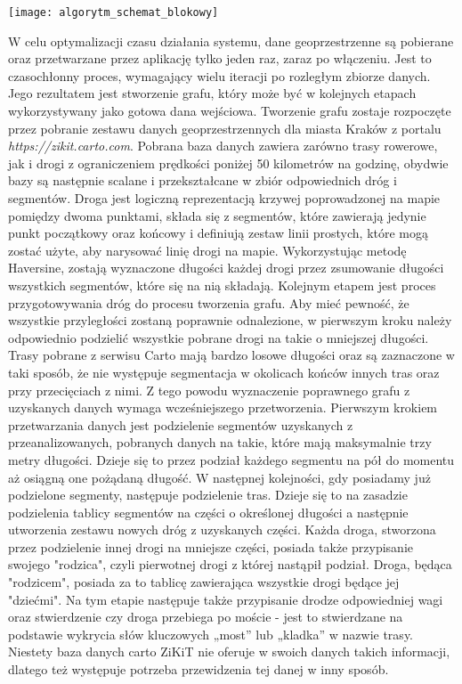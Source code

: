 \begin{center}
\texttt{[image: algorytm\_schemat\_blokowy]}
\end{center}

W celu optymalizacji czasu działania systemu, dane geoprzestrzenne są pobierane oraz przetwarzane przez aplikację tylko jeden raz, zaraz po włączeniu. Jest to czasochłonny proces, wymagający wielu iteracji po rozległym zbiorze danych. Jego rezultatem jest stworzenie grafu, który może być w kolejnych etapach wykorzystywany jako gotowa dana wejściowa. Tworzenie grafu zostaje rozpoczęte przez pobranie zestawu danych geoprzestrzennych dla miasta Kraków z portalu \textit{https://zikit.carto.com}. Pobrana baza danych zawiera zarówno trasy rowerowe, jak i drogi z ograniczeniem prędkości poniżej 50 kilometrów na godzinę, obydwie bazy są następnie scalane i przekształcane w zbiór odpowiednich dróg i segmentów. Droga jest logiczną reprezentacją krzywej poprowadzonej na mapie pomiędzy dwoma punktami, składa się z segmentów, które zawierają jedynie punkt początkowy oraz końcowy i definiują zestaw linii prostych, które mogą zostać użyte, aby narysować linię drogi na mapie. Wykorzystując metodę Haversine, zostają wyznaczone długości każdej drogi przez zsumowanie długości wszystkich segmentów, które się na nią składają. \newline
Kolejnym etapem jest proces przygotowywania dróg do procesu tworzenia grafu. Aby mieć pewność, że wszystkie przyległości zostaną poprawnie odnalezione, w pierwszym kroku należy odpowiednio podzielić wszystkie pobrane drogi na takie o mniejszej długości. Trasy pobrane z serwisu Carto mają bardzo losowe długości oraz są zaznaczone w taki sposób, że nie występuje segmentacja w okolicach końców innych tras oraz przy przecięciach z nimi. Z tego powodu wyznaczenie poprawnego grafu z uzyskanych danych wymaga wcześniejszego przetworzenia. Pierwszym krokiem przetwarzania danych jest podzielenie segmentów uzyskanych z przeanalizowanych, pobranych danych na takie, które mają maksymalnie trzy metry długości. Dzieje się to przez podział każdego segmentu na pół do momentu aż osiągną one pożądaną długość. W następnej kolejności, gdy posiadamy już podzielone segmenty, następuje podzielenie tras. Dzieje się to na zasadzie podzielenia tablicy segmentów na części o określonej długości a następnie utworzenia zestawu nowych dróg z uzyskanych części. Każda droga, stworzona przez podzielenie innej drogi na mniejsze części, posiada także przypisanie swojego "rodzica", czyli pierwotnej drogi z której nastąpił podział. Droga, będąca "rodzicem", posiada za to tablicę zawierająca wszystkie drogi będące jej "dziećmi". Na tym etapie następuje także przypisanie drodze odpowiedniej wagi oraz stwierdzenie czy droga przebiega po moście - jest to stwierdzane na podstawie wykrycia słów kluczowych „most” lub „kladka” w nazwie trasy. Niestety baza danych carto ZiKiT nie oferuje w swoich danych takich informacji, dlatego też występuje potrzeba przewidzenia tej danej w inny sposób. \newline

